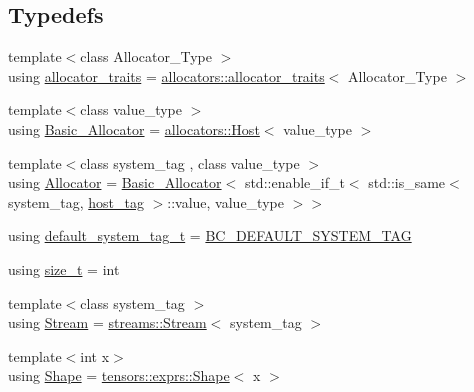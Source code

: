 \subsection*{Typedefs}
\begin{DoxyCompactItemize}
\item 
{\footnotesize template$<$class Allocator\+\_\+\+Type $>$ }\\using \hyperlink{namespaceBC_a702bcffa3526460ac93fb2a315f2f7c7}{allocator\+\_\+traits} = \hyperlink{structBC_1_1allocators_1_1allocator__traits}{allocators\+::allocator\+\_\+traits}$<$ Allocator\+\_\+\+Type $>$
\item 
{\footnotesize template$<$class value\+\_\+type $>$ }\\using \hyperlink{namespaceBC_a887e2503ef30c92b917feb4a80f92a69}{Basic\+\_\+\+Allocator} = \hyperlink{structBC_1_1allocators_1_1Host}{allocators\+::\+Host}$<$ value\+\_\+type $>$
\item 
{\footnotesize template$<$class system\+\_\+tag , class value\+\_\+type $>$ }\\using \hyperlink{namespaceBC_a934f94b17b06290e6b241e5f59930c5f}{Allocator} = \hyperlink{namespaceBC_a887e2503ef30c92b917feb4a80f92a69}{Basic\+\_\+\+Allocator}$<$ std\+::enable\+\_\+if\+\_\+t$<$ std\+::is\+\_\+same$<$ system\+\_\+tag, \hyperlink{structBC_1_1host__tag}{host\+\_\+tag} $>$\+::value, value\+\_\+type $>$$>$
\item 
using \hyperlink{namespaceBC_abe6173b72b8ddcda096eac20d5110e72}{default\+\_\+system\+\_\+tag\+\_\+t} = \hyperlink{BlackCat__Common_8h_afe0743760bd7b796144b764d8c5ab66c}{B\+C\+\_\+\+D\+E\+F\+A\+U\+L\+T\+\_\+\+S\+Y\+S\+T\+E\+M\+\_\+\+T\+AG}
\item 
using \hyperlink{namespaceBC_a6007cbc4eeec401a037b558910a56173}{size\+\_\+t} = int
\item 
{\footnotesize template$<$class system\+\_\+tag $>$ }\\using \hyperlink{namespaceBC_abc64a63cd29a22d102a68f478dfd588d}{Stream} = \hyperlink{classBC_1_1streams_1_1Stream}{streams\+::\+Stream}$<$ system\+\_\+tag $>$
\item 
{\footnotesize template$<$int x$>$ }\\using \hyperlink{namespaceBC_adac665f44bd5de19df55f8681248310b}{Shape} = \hyperlink{classBC_1_1tensors_1_1exprs_1_1Shape}{tensors\+::exprs\+::\+Shape}$<$ x $>$
\end{DoxyCompactItemize}
